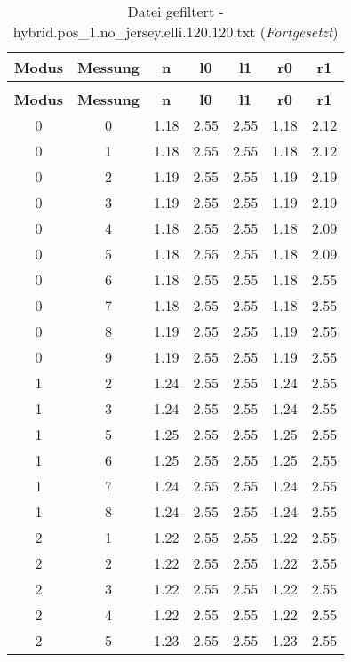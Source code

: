 \begin{longtable}{|c|c||c||c|c||c|c|}
	\caption{Datei gefiltert - hybrid.pos\_1.no\_jersey.elli.120.120.txt} \label{tab:hybrid.pos-1.no-jersey.elli.120.120.txt} \\ \hline
	\textbf{Modus} & \textbf{Messung} & \textbf{n} & \textbf{l0} & \textbf{l1} & \textbf{r0} & \textbf{r1}\\ \hline
	\endfirsthead
	\caption[]{Datei gefiltert - hybrid.pos\_1.no\_jersey.elli.120.120.txt (\emph{Fortgesetzt})} \\ \hline
	\textbf{Modus} & \textbf{Messung} & \textbf{n} & \textbf{l0} & \textbf{l1} & \textbf{r0} & \textbf{r1}\\ \hline
	\endhead
	0 & 0 & 1.18 & 2.55 & 2.55 & 1.18 & 2.12 \\ \hline
	0 & 1 & 1.18 & 2.55 & 2.55 & 1.18 & 2.12 \\ \hline
	0 & 2 & 1.19 & 2.55 & 2.55 & 1.19 & 2.19 \\ \hline
	0 & 3 & 1.19 & 2.55 & 2.55 & 1.19 & 2.19 \\ \hline
	0 & 4 & 1.18 & 2.55 & 2.55 & 1.18 & 2.09 \\ \hline
	0 & 5 & 1.18 & 2.55 & 2.55 & 1.18 & 2.09 \\ \hline
	0 & 6 & 1.18 & 2.55 & 2.55 & 1.18 & 2.55 \\ \hline
	0 & 7 & 1.18 & 2.55 & 2.55 & 1.18 & 2.55 \\ \hline
	0 & 8 & 1.19 & 2.55 & 2.55 & 1.19 & 2.55 \\ \hline
	0 & 9 & 1.19 & 2.55 & 2.55 & 1.19 & 2.55 \\ \hline
	1 & 2 & 1.24 & 2.55 & 2.55 & 1.24 & 2.55 \\ \hline
	1 & 3 & 1.24 & 2.55 & 2.55 & 1.24 & 2.55 \\ \hline
	1 & 5 & 1.25 & 2.55 & 2.55 & 1.25 & 2.55 \\ \hline
	1 & 6 & 1.25 & 2.55 & 2.55 & 1.25 & 2.55 \\ \hline
	1 & 7 & 1.24 & 2.55 & 2.55 & 1.24 & 2.55 \\ \hline
	1 & 8 & 1.24 & 2.55 & 2.55 & 1.24 & 2.55 \\ \hline
	2 & 1 & 1.22 & 2.55 & 2.55 & 1.22 & 2.55 \\ \hline
	2 & 2 & 1.22 & 2.55 & 2.55 & 1.22 & 2.55 \\ \hline
	2 & 3 & 1.22 & 2.55 & 2.55 & 1.22 & 2.55 \\ \hline
	2 & 4 & 1.22 & 2.55 & 2.55 & 1.22 & 2.55 \\ \hline
	2 & 5 & 1.23 & 2.55 & 2.55 & 1.23 & 2.55 \\ \hline

\end{longtable}
